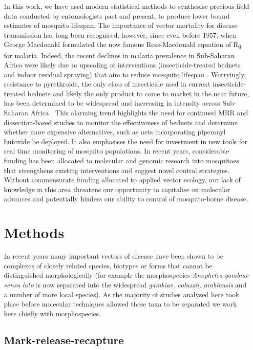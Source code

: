\documentclass[]{article}
\begin{document}
In this work, we have used modern statistical methods to synthesise precious field data conducted by entomologists past and present, to produce lower bound estimates of mosquito lifespan. The importance of vector mortality for disease transmission has long been recognised, however,
since even before 1957, when George Macdonald formulated the
now famous Ross-Macdonald equation of R\textsubscript{0} for malaria. Indeed, the recent declines in malaria prevalence in Sub-Saharan Africa were likely due to upscaling of interventions (insecticide-treated bednets and indoor residual spraying) that aim to reduce mosquito lifespan \citep{bhatt2015effect}. Worryingly, resistance to pyrethroids, the only class of insecticide used in current insecticide-treated bednets and likely the only product to come to market in the near
future, has been determined to be widespread and increasing in intensity
across Sub-Saharan Africa \citep{world2018global}. This alarming trend
highlights the need for continued MRR and dissection-based studies to
monitor the effectiveness of bednets and determine whether more
expensive alternatives, such as nets incorporating piperonyl butoxide be
deployed. It also emphasises the need for investment in new tools for
real time monitoring of mosquito populations. In recent years, considerable funding has been allocated to molecular and genomic research
into mosquitoes that strengthens existing interventions and suggest
novel control strategies. Without commensurate funding allocated to
applied vector ecology, our lack of knowledge in this area threatens our
opportunity to capitalise on molecular advances and potentially hinders
our ability to control of mosquito-borne disease.

\section{Methods}\label{methods}

In recent years many important vectors of disease have been shown to be
complexes of closely related species, biotypes or forms that cannot
be distinguished morphologically (for example the morphospecies
\emph{Anopheles gambiae sensu lato} is now separated into the widespread
\emph{gambiae, coluzzii, arabiensis} and a number of more local
species). As the majority of studies analysed here took place before
molecular techniques allowed these taxa to be separated we work here
chiefly with morphospecies.

\subsection{Mark-release-recapture}\label{mark-release-recapture}
\end{document}
